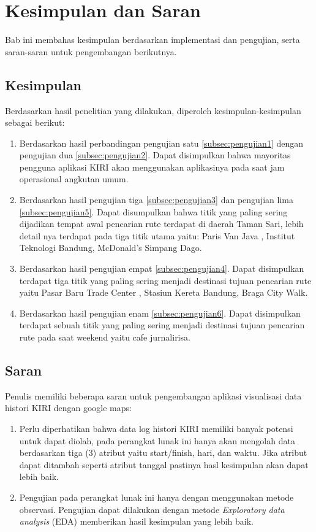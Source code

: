 \chapter{Kesimpulan dan Saran}
\label{chap:kesimpulan_dan_saran}
Bab ini membahas kesimpulan berdasarkan implementasi dan pengujian, serta saran-saran untuk pengembangan berikutnya.

\section{Kesimpulan}
Berdasarkan hasil penelitian yang dilakukan, diperoleh kesimpulan-kesimpulan sebagai berikut:
\begin{enumerate}
	\item Berdasarkan hasil perbandingan pengujian satu \ref{subsec:pengujian1} dengan pengujian dua \ref{subsec:pengujian2}. Dapat disimpulkan bahwa mayoritas pengguna aplikasi KIRI akan menggunakan aplikasinya pada saat jam operasional angkutan umum.
	
	\item Berdasarkan hasil pengujian tiga \ref{subsec:pengujian3} dan pengujian lima \ref{subsec:pengujian5}. Dapat disumpulkan bahwa titik yang paling sering dijadikan tempat awal pencarian rute terdapat di daerah Taman Sari, lebih detail nya terdapat pada tiga titik utama yaitu: Paris Van Java , Institut Teknologi Bandung, McDonald's Simpang Dago.
	
	\item Berdasarkan hasil pengujian empat \ref{subsec:pengujian4}. Dapat disimpulkan terdapat tiga titik yang paling sering menjadi destinasi tujuan pencarian rute yaitu Pasar Baru Trade Center , Stasiun Kereta Bandung, Braga City Walk.
	
	\item Berdasarkan hasil pengujian enam \ref{subsec:pengujian6}. Dapat disimpulkan terdapat sebuah  titik yang paling sering menjadi destinasi tujuan pencarian rute pada saat weekend  yaitu cafe jurnalirisa.
	
\end{enumerate}

\section{Saran}
Penulis memiliki beberapa saran untuk pengembangan aplikasi visualisasi data histori KIRI dengan google maps:
\begin{enumerate}
	\item Perlu diperhatikan bahwa data log histori KIRI memiliki banyak potensi untuk dapat diolah, pada perangkat lunak ini hanya akan mengolah data berdasarkan tiga (3) atribut yaitu start/finish, hari, dan waktu. Jika atribut dapat ditambah seperti atribut tanggal pastinya hasl kesimpulan akan dapat lebih baik. 
	
	\item Pengujian pada perangkat lunak ini hanya dengan menggunakan metode observasi. Pengujian dapat dilakukan dengan metode \textit{Exploratory data analysis} (EDA) memberikan hasil kesimpulan yang lebih baik.
\end{enumerate}